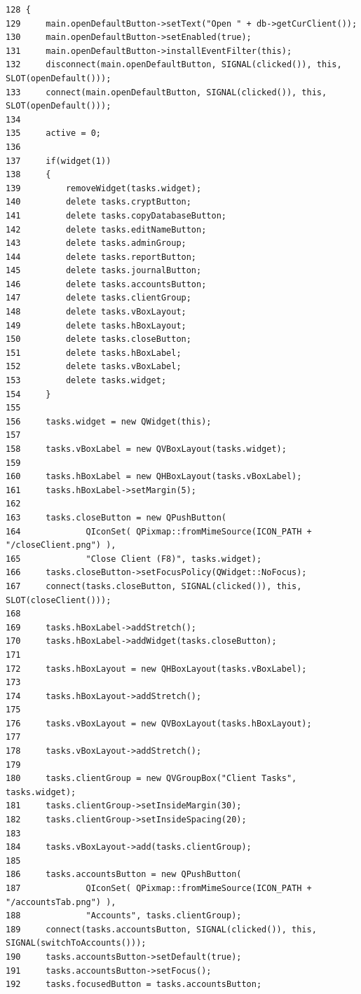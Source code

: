 \footnotesize\begin{verbatim}128 {
129     main.openDefaultButton->setText("Open " + db->getCurClient());
130     main.openDefaultButton->setEnabled(true);
131     main.openDefaultButton->installEventFilter(this);
132     disconnect(main.openDefaultButton, SIGNAL(clicked()), this, SLOT(openDefault()));
133     connect(main.openDefaultButton, SIGNAL(clicked()), this, SLOT(openDefault()));
134     
135     active = 0;
136 
137     if(widget(1))
138     {
139         removeWidget(tasks.widget);
140         delete tasks.cryptButton;
141         delete tasks.copyDatabaseButton;
142         delete tasks.editNameButton;
143         delete tasks.adminGroup;
144         delete tasks.reportButton;
145         delete tasks.journalButton;
146         delete tasks.accountsButton;
147         delete tasks.clientGroup;
148         delete tasks.vBoxLayout;
149         delete tasks.hBoxLayout;
150         delete tasks.closeButton;
151         delete tasks.hBoxLabel;
152         delete tasks.vBoxLabel;
153         delete tasks.widget;
154     }
155     
156     tasks.widget = new QWidget(this);
157     
158     tasks.vBoxLabel = new QVBoxLayout(tasks.widget);
159     
160     tasks.hBoxLabel = new QHBoxLayout(tasks.vBoxLabel);
161     tasks.hBoxLabel->setMargin(5);
162     
163     tasks.closeButton = new QPushButton(
164             QIconSet( QPixmap::fromMimeSource(ICON_PATH + "/closeClient.png") ),
165             "Close Client (F8)", tasks.widget);
166     tasks.closeButton->setFocusPolicy(QWidget::NoFocus);
167     connect(tasks.closeButton, SIGNAL(clicked()), this, SLOT(closeClient()));
168     
169     tasks.hBoxLabel->addStretch();
170     tasks.hBoxLabel->addWidget(tasks.closeButton);
171     
172     tasks.hBoxLayout = new QHBoxLayout(tasks.vBoxLabel);
173     
174     tasks.hBoxLayout->addStretch();
175     
176     tasks.vBoxLayout = new QVBoxLayout(tasks.hBoxLayout);
177     
178     tasks.vBoxLayout->addStretch();
179     
180     tasks.clientGroup = new QVGroupBox("Client Tasks", tasks.widget);
181     tasks.clientGroup->setInsideMargin(30);
182     tasks.clientGroup->setInsideSpacing(20);
183     
184     tasks.vBoxLayout->add(tasks.clientGroup);
185     
186     tasks.accountsButton = new QPushButton(
187             QIconSet( QPixmap::fromMimeSource(ICON_PATH + "/accountsTab.png") ),
188             "Accounts", tasks.clientGroup);
189     connect(tasks.accountsButton, SIGNAL(clicked()), this, SIGNAL(switchToAccounts()));
190     tasks.accountsButton->setDefault(true);
191     tasks.accountsButton->setFocus();
192     tasks.focusedButton = tasks.accountsButton;

\end{verbatim}
